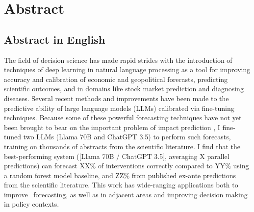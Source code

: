 \documentclass[12pt,a4paper]{article}
\makeatletter
\newcommand{\ThesisTitle}{\TITLE}
\newcommand{\ThesisCity}{[City]}
\newcommand{\ThesisDate}{[Date]}
\newcommand{\AuthorName}{Daniel Morgan Rivers}
\newcommand{\AuthorAddressTwo}{Berlin, Germany 10559}
\newcommand{\AuthorEmail}{rivers@uni-potsdam.de}
\newcommand{\MatricNo}{829112}
\newcommand{\FirstReviewer}{Prof. Christian Kuhlicke}
\newcommand{\SecondReviewer}{Dr. Ivan Kuznetzov}
\makeatother
\begin{document}
\begin{center}






\end{center}
\clearpage
\section*{Abstract}
\subsection*{Abstract in English}
The field of decision science has made rapid strides with the introduction of techniques of deep learning in natural language processing as a tool for improving accuracy and calibration of economic and geopolitical forecasts, predicting scientific outcomes, and in domains like stock market prediction and diagnosing diseases. Several recent methods and improvements have been made to the predictive ability of large language models (LLMs) calibrated via fine-tuning techniques. Because some of these powerful forecasting techniques have not yet been brought to bear on the important problem of impact prediction \ABSTRACT, I fine-tuned two LLMs (Llama 70B and ChatGPT 3.5) to perform such forecasts, training on thousands of abstracts from the scientific literature. I find that the best-performing system ([Llama 70B / ChatGPT 3.5], averaging X parallel predictions) can forecast XX\% of interventions correctly compared to YY\% using a random forest model baseline, and ZZ\% from published ex-ante predictions from the scientific literature. This work has wide-ranging applications both to improve \DOMAIN\ forecasting, as well as in adjacent areas and improving decision making in policy contexts.
\end{document}
